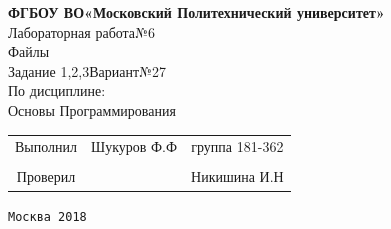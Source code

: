 \documentclass[a4paper]{article}
\begin{document}
\begin{center}
\hfill \break
\large{\textbf{ФГБОУ ВО«Московский Политехнический университет»}}\\
\hfill \break
\hfill \break
\hfill \break
\hfill \break
\hfill \break
\hfill \break
\hfill \break
\large{Лабораторная работа№6}\\
\footnotesize{Файлы\\
Задание 1,2,3\hspace{3cm}Вариант№27\break\\
По дисциплине:\\
Основы Программирования
}
\end{center}
\hfill \break
\hfill \break
\hfill \break
\hfill \break
\hfill \break
\hfill \break
\hfill \break
\hfill \break
\hfill \break
\hfill \break
\normalsize{ 
\begin{tabular}{ccc}
\hspace{4cm}Выполнил & Шукуров Ф.Ф  & группа 181-362\\
\\
\hspace{4cm}Проверил & \underline{\hspace{3cm}}& Никишина И.Н
\end{tabular}
}
\hfill \break
\hfill \break
\hfill \break
\hfill \break
\hfill \break
\hfill \break
\hfill \break
\hfill \break
\hfill \break
\hfill \break
\hfill \break
\hfill \break
\begin{center}\texttt{Москва 2018}\end{center}
\thispagestyle{empty}
\end{document}
